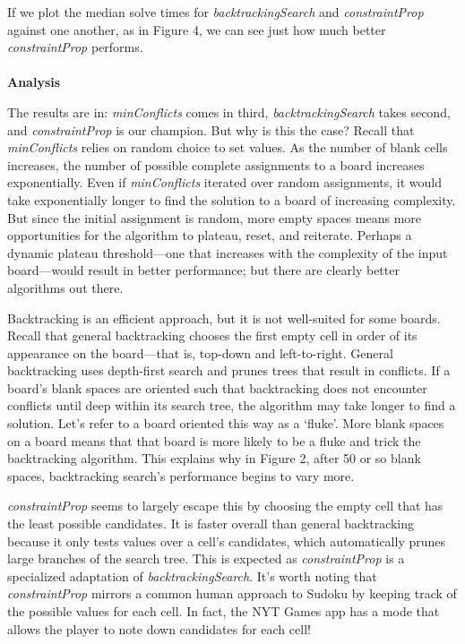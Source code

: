 \documentclass[12pt]{article}
\begin{document}
	If we plot the median solve times for \textit{backtrackingSearch} and \textit{constraintProp} against one another, as in Figure 4, we can see just how much better \textit{constraintProp} performs.\\\\
	\textbf{Analysis}

	The results are in: \textit{minConflicts} comes in third, \textit{backtrackingSearch} takes second, and \textit{constraintProp} is our champion. But why is this the case? Recall that \textit{minConflicts} relies on random choice to set values. As the number of blank cells increases, the number of possible complete assignments to a board increases exponentially. Even if \textit{minConflicts} iterated over random assignments, it would take exponentially longer to find the solution to a board of increasing complexity. But since the initial assignment is random, more empty spaces means more opportunities for the algorithm to plateau, reset, and reiterate. Perhaps a dynamic plateau threshold---one that increases with the complexity of the input board---would result in better performance; but there are clearly better algorithms out there.
	
	Backtracking is an efficient approach, but it is not well-suited for some boards. Recall that general backtracking chooses the first empty cell in order of its appearance on the board---that is, top-down and left-to-right. General backtracking uses depth-first search and prunes trees that result in conflicts. If a board's blank spaces are oriented such that backtracking does not encounter conflicts until deep within its search tree, the algorithm may take longer to find a solution. Let's refer to a board oriented this way as a `fluke'. More blank spaces on a board means that that board is more likely to be a fluke and trick the backtracking algorithm. This explains why in Figure 2, after 50 or so blank spaces, backtracking search's performance begins to vary more.
	
	\textit{constraintProp} seems to largely escape this by choosing the empty cell that has the least possible candidates. It is faster overall than general backtracking because it only tests values over a cell's candidates, which automatically prunes large branches of the search tree. This is expected as \textit{constraintProp} is a specialized adaptation of \textit{backtrackingSearch}. It's worth noting that \textit{constraintProp} mirrors a common human approach to Sudoku by keeping track of the possible values for each cell. In fact, the NYT Games app has a mode that allows the player to note down candidates for each cell!
	
\end{document}
